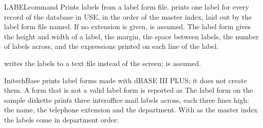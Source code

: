 \begin{XbaseEntry}{LABEL}{command}
Prints labels from a label form file.
\Syntax
{}
\Usage
{} prints one label for every record of the database in USE,
in the order of the master index, laid out by the label form file named.
If no extension is given,  is assumed.  The label form gives the
height and width of a label, the margin, the space between labels, the
number of labels across, and the expressions printed on each line of the
label.

 writes the labels to a text file instead of the screen;
 is assumed.

InitechBase prints label forms made with dBASE III PLUS; it does not create
them.  A form that is not a valid label form is reported as
\Examples
The label form  on the sample diskette prints three
interoffice mail labels across, each three lines high: the name, the
telephone extension and the department.  With  as the
master index the labels come in department order:
\end{XbaseEntry}

